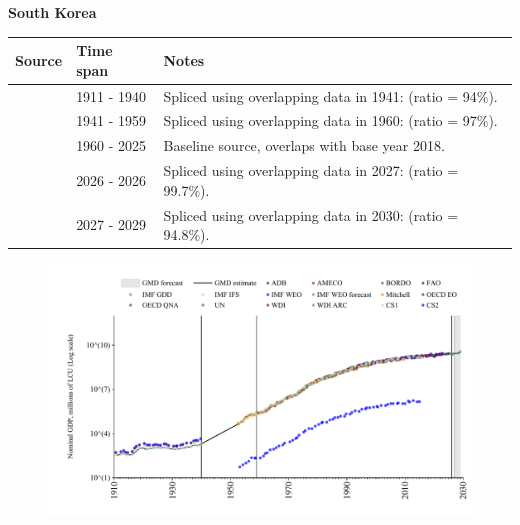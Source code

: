 \documentclass[12pt,a4paper,landscape]{article}
\begin{document}
\begin{adjustbox}{max totalsize={\paperwidth}{\paperheight},center}
\begin{minipage}[t][\textheight][t]{\textwidth}
\vspace*{0.5cm}
{}
\begin{center}
{\Large\bfseries South Korea}
\end{center}
\vspace{0.5cm}
\begin{table}[H]
\centering
\small
\begin{tabular}{|l|l|l|}
\hline
\textbf{Source} & \textbf{Time span} & \textbf{Notes} \\
\hline
\rowcolor{white}\cite{CS1_KOR}& 1911 - 1940 &Spliced using overlapping data in 1941: (ratio = 94\%).\\
\rowcolor{lightgray}\cite{IMF_GDD}& 1941 - 1959 &Spliced using overlapping data in 1960: (ratio = 97\%).\\
\rowcolor{white}\cite{OECD_EO}& 1960 - 2025 &Baseline source, overlaps with base year 2018.\\
\rowcolor{lightgray}\cite{AMECO}& 2026 - 2026 &Spliced using overlapping data in 2027: (ratio = 99.7\%).\\
\rowcolor{white}\cite{IMF_WEO_forecast}& 2027 - 2029 &Spliced using overlapping data in 2030: (ratio = 94.8\%).\\
\hline
\end{tabular}
\end{table}
\begin{figure}[H]
\centering
\includegraphics[width=\textwidth,height=0.6\textheight,keepaspectratio]{graphs/KOR_nGDP.pdf}
\end{figure}
\end{minipage}
\end{adjustbox}
\end{document}
